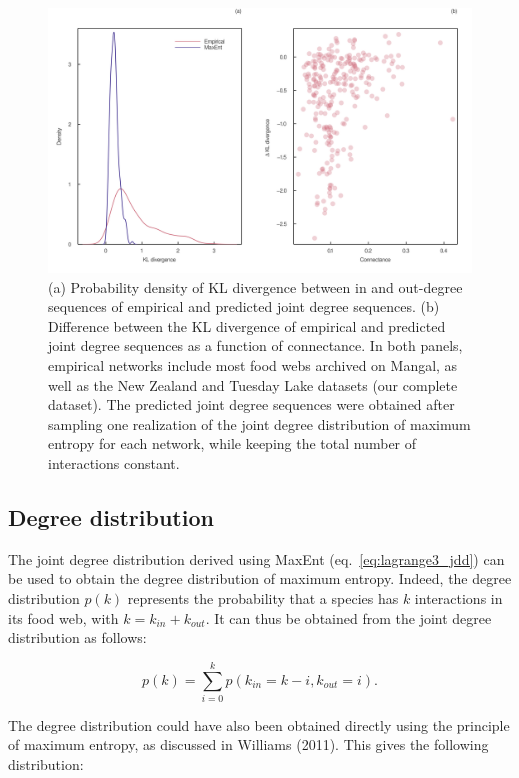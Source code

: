 \documentclass[10pt,oneside]{article}
\makeatletter
\def\maxwidth{\ifdim\Gin@nat@width>\linewidth\linewidth
\else\Gin@nat@width\fi}
\let\Oldincludegraphics\includegraphics
\renewcommand{\includegraphics}[1]{\Oldincludegraphics[width=\maxwidth]{#1}}
\makeatother
\begin{document}
\begin{figure}
\hypertarget{fig:kl_diverg}{%
\centering
\includegraphics{figures/kl_divergence.png}
\caption{(a) Probability density of KL divergence between in and
out-degree sequences of empirical and predicted joint degree sequences.
(b) Difference between the KL divergence of empirical and predicted
joint degree sequences as a function of connectance. In both panels,
empirical networks include most food webs archived on Mangal, as well as
the New Zealand and Tuesday Lake datasets (our complete dataset). The
predicted joint degree sequences were obtained after sampling one
realization of the joint degree distribution of maximum entropy for each
network, while keeping the total number of interactions
constant.}\label{fig:kl_diverg}
}
\end{figure}

\hypertarget{degree-distribution}{%
\subsection{Degree distribution}\label{degree-distribution}}

The joint degree distribution derived using MaxEnt
(eq.~\ref{eq:lagrange3_jdd}) can be used to obtain the degree
distribution of maximum entropy. Indeed, the degree distribution
\(p(k)\) represents the probability that a species has \(k\)
interactions in its food web, with \(k = k_{in} + k_{out}\). It can thus
be obtained from the joint degree distribution as follows:

\[p(k) = \sum_{i=0}^k p(k_{in} = k - i, k_{out} = i).\]

The degree distribution could have also been obtained directly using the
principle of maximum entropy, as discussed in Williams (2011). This
gives the following distribution:
\end{document}

